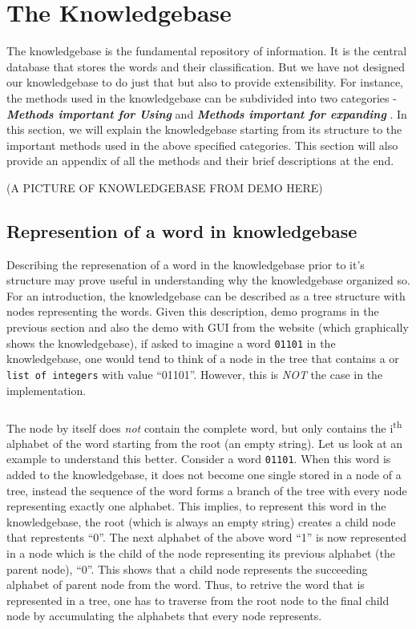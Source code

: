 \chapter{The Knowledgebase}

The knowledgebase is the fundamental repository of information. It is the central database that stores the words and their classification. But we have not designed our knowledgebase to do just that but also to provide extensibility. For instance, the methods used in the knowledgebase can be subdivided into two categories - \textbf{\emph{Methods important for Using \libalf}} and \textbf{\emph{Methods important for expanding \libalf}}. In this section, we will explain the knowledgebase starting from its structure to the important methods used in the above specified categories. This section will also provide an appendix of all the methods and their brief descriptions at the end. 

(A PICTURE OF KNOWLEDGEBASE FROM DEMO HERE)

\section{Represention of a word in knowledgebase}

	Describing the represenation of a word in the knowledgebase prior to it's structure may prove useful in understanding why the knowledgebase organized so. 
	For an introduction, the knowledgebase can be described as a tree structure with nodes representing the words. Given this description, demo programs in the previous section and also the demo with GUI from the website (which graphically shows the knowledgebase), if asked to imagine a word \texttt{01101} in the knowledgebase, one would tend to think of a node in the tree that contains a \stringtype or \texttt{list of integers} with value ``01101''. However, this is \emph{NOT} the case in the implementation.
	\paragraph{}
	The node by itself does \emph{not} contain the complete word, but only contains the i\textsuperscript{th} alphabet of the word starting from the root (an empty string). Let us look at an example to understand this better.
	Consider a word \texttt{01101}. When this word is added to the knowledgebase, it does not become one single \stringtype stored in a node of a tree, instead the sequence of the word forms a branch of the tree with every node representing exactly one alphabet. This implies, to represent this word in the knowledgebase, the root (which is always an empty string) creates a child node that represtents ``0''. The next alphabet of the above word ``1'' is now represented in a node which is the child of the node representing its previous alphabet (the parent node), ``0''. This shows that a child node represents the succeeding alphabet of parent node from the word.
	Thus, to retrive the word that is represented in a tree, one has to traverse from the root node to the final child node by accumulating the alphabets that every node represents.
	\vskip 1pt

